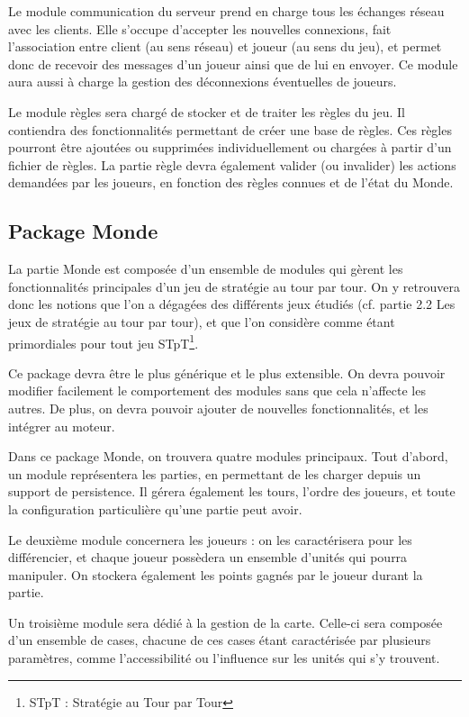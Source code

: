 \documentclass[a4paper,10pt]{report}
\begin{document}
        Le module communication du serveur prend en charge tous les échanges réseau avec les clients. Elle s'occupe d'accepter les nouvelles connexions, fait l'association entre client (au sens réseau) et joueur (au sens du jeu), et permet donc de recevoir des messages d'un joueur ainsi que de lui en envoyer. Ce module aura aussi à charge la gestion des déconnexions éventuelles de joueurs. 

        Le module règles sera chargé de stocker et de traiter les règles du jeu. Il contiendra des fonctionnalités permettant de créer une base de règles. Ces règles pourront être ajoutées ou supprimées individuellement ou chargées à partir d'un fichier de règles. La partie règle devra également valider (ou invalider) les actions demandées par les joueurs, en fonction des règles connues et de l'état du Monde.

      \subsection{Package Monde}

        La partie Monde est composée d'un ensemble de modules qui gèrent les fonctionnalités principales d'un jeu de stratégie au tour par tour. On y retrouvera donc les notions que l'on a dégagées des différents jeux étudiés (cf. partie 2.2 Les jeux de stratégie au tour par tour), et que l'on considère comme étant primordiales pour tout jeu STpT\footnote{STpT : Stratégie au Tour par Tour}. 
        
        Ce package devra être le plus générique et le plus extensible. On devra pouvoir modifier facilement le comportement des modules sans que cela n'affecte les autres. De plus, on devra pouvoir ajouter de nouvelles fonctionnalités, et les intégrer au moteur.

        Dans ce package Monde, on trouvera quatre modules principaux. Tout d'abord, un module représentera les parties, en permettant de les charger depuis un support de persistence. Il gérera également les tours, l'ordre des joueurs, et toute la configuration particulière qu'une partie peut avoir. 
        
        Le deuxième module concernera les joueurs : on les caractérisera pour les différencier, et chaque joueur possèdera un ensemble d'unités qui pourra manipuler. On stockera également les points gagnés par le joueur durant la partie. 

        Un troisième module sera dédié à la gestion de la carte. Celle-ci sera composée d'un ensemble de cases, chacune de ces cases étant caractérisée par plusieurs paramètres, comme l'accessibilité ou l'influence sur les unités qui s'y trouvent. 
\end{document}
